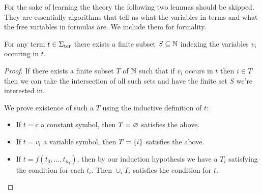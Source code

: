 For the sake of learning the theory the following two lemmas should be skipped.
They are essentially algorithms that tell us what the variables in terms 
and what the free variables in formulas are.
We include them for formality.
\begin{prop}
    For any term $t \in {\Sigma}_\mathrm{ter}$ there exists a finite subset 
    $S \subseteq \mathbb{N}$ indexing the variables $v_i$ occuring in $t$.
\end{prop}
\begin{proof}
    If there exists a finite subset $T$ of $\mathbb{N}$ such that if $v_i$ occurs in $t$
    then $i \in T$
    then we can take the intersection of all such
    sets and have the finite set $S$ we're interested in.
    
    We prove existence of such a 
    $T$ using the inductive definition of $t$:
    \begin{itemize}
        \item If $t = c$ a constant symbol, 
        then $T = \varnothing$ satisfies the above.
        \item If $t = v_i$ a variable symbol, 
        then $T = \left\{i\right\}$ satisfies the above.
        \item If $t = f(t_0, \dots, t_{n_f})$, 
        then by our induction hypothesis we have 
        a $T_i$ satisfying the condition for each $t_i$. 
        Then $\cup_{i} T_i$ satisfies the condition for $t$.
    \end{itemize}
\end{proof}

